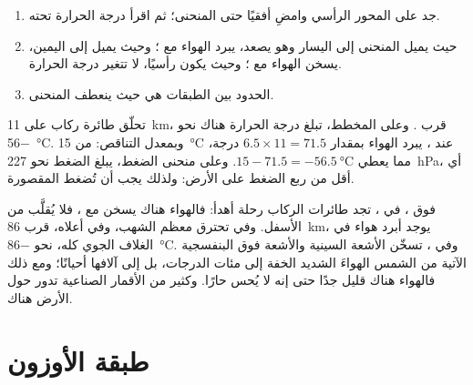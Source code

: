 \begin{method}\label{met:g8:the-atmosphere:profile}
\begin{enumerate}
  \item جد  على المحور الرأسي وامضِ أفقيًا حتى المنحنى؛ ثم اقرأ
        درجة الحرارة تحته.
  \item حيث يميل المنحنى إلى اليسار وهو يصعد، يبرد الهواء مع ؛
        وحيث يميل إلى اليمين، يسخن الهواء مع ؛ وحيث يكون رأسيًا،
        لا تتغير درجة الحرارة.
  \item الحدود بين الطبقات هي حيث ينعطف المنحنى.
\end{enumerate}
\end{method}

\begin{example}\label{ex:g8:the-atmosphere:airliner}
تحلّق طائرة ركاب على  \qty{11}{km}، قرب . وعلى المخطط،
تبلغ درجة الحرارة هناك نحو \qty{-56}{\degreeCelsius}. وبمعدل التناقص: من
\qty{15}{\degreeCelsius} عند ، يبرد الهواء
بمقدار $6.5 \times 11 = 71.5$ درجة، مما يعطي $15 - 71.5 =
\qty{-56.5}{\degreeCelsius}$. وعلى منحنى الضغط، يبلغ الضغط
نحو \qty{227}{hPa}، أي أقل من ربع الضغط على الأرض:
ولذلك يجب أن تُضغط المقصورة.
\end{example}

فوق ، في ، تجد طائرات الركاب رحلة أهدأ: فالهواء
هناك يسخن مع ، فلا يُقلَّب من الأسفل. وفي  تحترق معظم
الشهب، وفي أعلاه، قرب \qty{86}{km}، يوجد أبرد هواء في الغلاف الجوي كله،
نحو \qty{-86}{\degreeCelsius}. وفي ، تسخّن الأشعة السينية
والأشعة فوق البنفسجية الآتية من الشمس الهواءَ الشديد الخفة إلى مئات
الدرجات، بل إلى آلافها أحيانًا؛ ومع ذلك فالهواء هناك قليل جدًا حتى إنه
لا يُحس حارًا. وكثير من الأقمار الصناعية تدور حول الأرض هناك.

\section{طبقة الأوزون}

